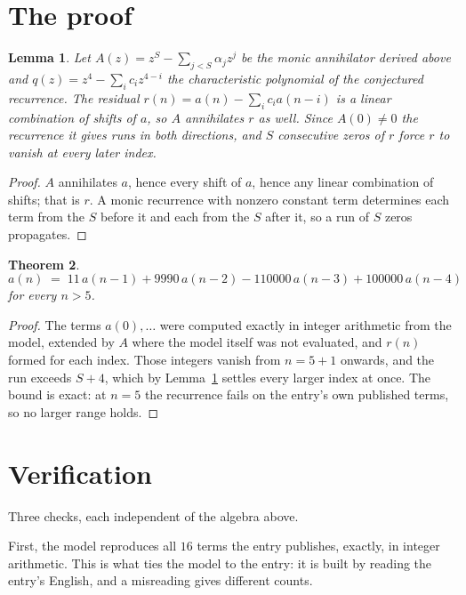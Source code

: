 \documentclass[11pt,a4paper]{article}
\theoremstyle{plain}
\newtheorem{theorem}{Theorem}
\newtheorem{lemma}[theorem]{Lemma}
\theoremstyle{definition}
\begin{document}
\section{The proof}

\begin{lemma}\label{lem:crit}
Let $A(z)=z^S-\sum_{j<S}\alpha_jz^{j}$ be the monic annihilator derived above and
$q(z)=z^{4}-\sum_ic_iz^{4-i}$ the characteristic polynomial of the conjectured
recurrence. The residual $r(n)=a(n)-\sum_ic_ia(n-i)$ is a linear combination of shifts of $a$,
so $A$ annihilates $r$ as well. Since $A(0)\ne0$ the recurrence it gives runs in both
directions, and $S$ consecutive zeros of $r$ force $r$ to vanish at every later index.
\end{lemma}

\begin{proof}
$A$ annihilates $a$, hence every shift of $a$, hence any linear combination of shifts; that is
$r$. A monic recurrence with nonzero constant term determines each term from the $S$ before it
and each from the $S$ after it, so a run of $S$ zeros propagates.
\end{proof}

\begin{theorem}
\[
a(n)\;=\;11\,a(n-1) + 9990\,a(n-2) - 110000\,a(n-3) + 100000\,a(n-4)
\]
for every $n>5$.
\end{theorem}

\begin{proof}
The terms $a(0),\dots$ were computed exactly in integer arithmetic from the model, extended by
$A$ where the model itself was not evaluated, and $r(n)$ formed for each index. Those integers
vanish from $n=5+1$ onwards, and the run exceeds $S+4$, which by
Lemma~\ref{lem:crit} settles every larger index at once. The bound is exact: at $n=5$ the recurrence fails on the entry's own published terms, so no larger range holds.
\end{proof}

\section{Verification}

Three checks, each independent of the algebra above.

First, the model reproduces all $16$ terms the entry publishes, exactly, in integer
arithmetic. This is what ties the model to the entry: it is built by reading the entry's
English, and a misreading gives different counts.
\end{document}
